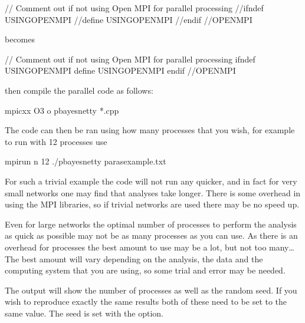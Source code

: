 \documentclass[letterpaper,10pt,english]{sphinxmanual}
\begin{document}
\begin{sphinxVerbatim}[commandchars=\\\{\}]
// Comment out if not using Open MPI for parallel processing
//\PYGZsh{}ifndef USING\PYGZus{}OPEN\PYGZus{}MPI
//\PYGZsh{}define USING\PYGZus{}OPEN\PYGZus{}MPI
//\PYGZsh{}endif //OPEN\PYGZus{}MPI
\end{sphinxVerbatim}

\sphinxAtStartPar
becomes

\begin{sphinxVerbatim}[commandchars=\\\{\}]
// Comment out if not using Open MPI for parallel processing
\PYGZsh{}ifndef USING\PYGZus{}OPEN\PYGZus{}MPI
\PYGZsh{}define USING\PYGZus{}OPEN\PYGZus{}MPI
\PYGZsh{}endif //OPEN\PYGZus{}MPI
\end{sphinxVerbatim}

\sphinxAtStartPar
then compile the parallel code as follows:

\begin{sphinxVerbatim}[commandchars=\\\{\}]
mpicxx \PYGZhy{}O3 \PYGZhy{}o pbayesnetty *.cpp
\end{sphinxVerbatim}

\sphinxAtStartPar
The code can then be ran using how many processes that you wish, for example to run with 12 processes use

\begin{sphinxVerbatim}[commandchars=\\\{\}]
mpirun \PYGZhy{}n 12 ./pbayesnetty paras\PYGZhy{}example.txt
\end{sphinxVerbatim}

\sphinxAtStartPar
For such a trivial example the code will not run any quicker, and in fact for very small networks one may find that analyses take longer.
There is some overhead in using the MPI libraries, so if trivial networks are used there may be no speed up.

\sphinxAtStartPar
Even for large networks the optimal number of processes to perform the analysis as quick as possible may not be as many processes as you can use. As there is an overhead for processes the best amount to use may be a lot, but not too many…
The best amount will vary depending on the analysis, the data and the computing system that you are using, so some trial and error may be needed.

\sphinxAtStartPar
The output will show the number of processes as well as the random seed. If you wish to reproduce exactly the same results both of these need to be set to the same value.
The seed is set with the  option.
\end{document}
